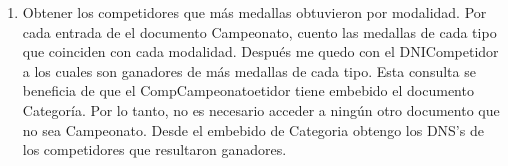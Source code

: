 \begin{enumerate}
\item Obtener los competidores que más medallas obtuvieron por modalidad. Por cada entrada de el documento Campeonato,
cuento las medallas de cada tipo que coinciden con cada modalidad. Después me quedo con el DNICompetidor a los cuales
son ganadores de más medallas de cada tipo. Esta consulta se beneficia de que el CompCampeonatoetidor tiene embebido
el documento Categoría. Por lo tanto, no es necesario acceder a ningún otro documento que no sea Campeonato. Desde el embebido
 de Categoria obtengo los DNS's de los competidores que resultaron ganadores.

\end{enumerate}
